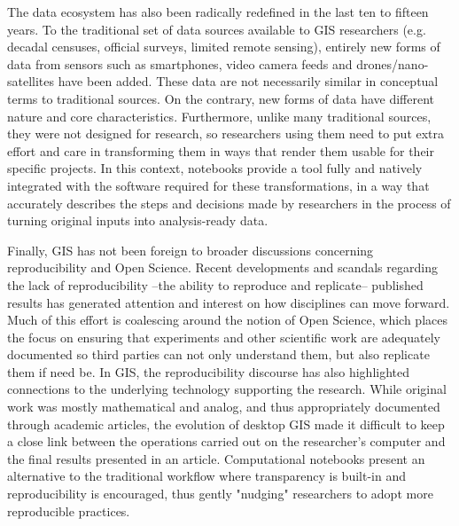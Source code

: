 \documentclass[11pt,letterpaper]{article}
\begin{document}
The data ecosystem has also been radically redefined in the last ten to fifteen years.
To the traditional set of data sources available to GIS researchers (e.g. decadal censuses, official surveys, limited remote sensing), entirely new forms of data from sensors such as smartphones, video camera feeds and drones/nano-satellites have been added.
These data are not necessarily similar in conceptual terms to traditional sources.
On the contrary, new forms of data have different nature and core characteristics. Furthermore, unlike many traditional sources, they were not designed for research, so researchers using them need to put extra effort and care in transforming them in ways that render them usable for their specific projects.
In this context, notebooks provide a tool fully and natively integrated with the software required for these transformations, in a way that accurately describes the steps and decisions made by researchers in the process of turning original inputs into analysis-ready data.

Finally, GIS has not been foreign to broader discussions concerning reproducibility and Open Science.
Recent developments and scandals regarding the lack of reproducibility --the ability to reproduce and replicate-- published results has generated attention and interest on how disciplines can move forward. Much of this effort is coalescing around the notion of Open Science, which places the focus on ensuring that experiments and other scientific work are adequately documented so third parties can not only understand them, but also replicate them if need be.
In GIS, the reproducibility discourse has also highlighted connections to the underlying technology supporting the research. While original work was mostly mathematical and analog, and thus appropriately documented through academic articles, the evolution of desktop GIS made it difficult to keep a close link between the operations carried out on the researcher's computer and the final results presented in an article.
Computational notebooks present an alternative to the traditional workflow where transparency is built-in and reproducibility is encouraged, thus gently "nudging" researchers to adopt more reproducible practices.
\end{document}
